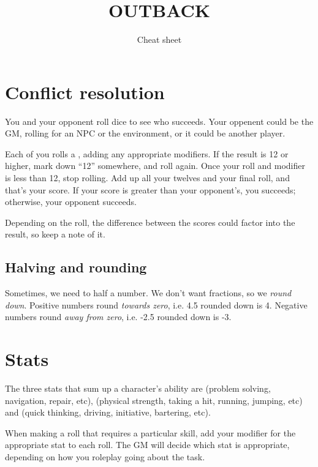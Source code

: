 \documentclass[10pt, a4paper, twocolumn]{article}
\title{\uppercase{Outback}}
\subtitle{Cheat sheet}
\date{}
\begin{document}
\maketitle

\section{Conflict resolution}
You and your opponent roll dice to see who succeeds. Your oppenent could be the
GM, rolling for an NPC or the environment, or it could be another player.

Each of you rolls a , adding any appropriate modifiers. If the result
is 12 or higher, mark down ``12'' somewhere, and roll again. Once your roll and
modifier is less than 12, stop rolling. Add up all your twelves and your final
roll, and that's your score. If your score is greater than your opponent's, you
succeeds; otherwise, your opponent succeeds.

Depending on the roll, the difference between the scores could factor into the
result, so keep a note of it. 

\subsection{Halving and rounding}
Sometimes, we need to half a number. We don't want fractions, so we
\emph{round down}. Positive numbers round \emph{towards zero}, i.e. 4.5
rounded down is 4. Negative numbers round \emph{away from zero}, i.e. -2.5
rounded down is -3.

\section{Stats}
The three stats that sum up a character's ability are  (problem
solving, navigation, repair,  etc),  (physical strength, taking a
hit, running, jumping, etc) and  (quick thinking, driving,
initiative, bartering, etc).

When making a roll that requires a particular skill, add your modifier for the
appropriate stat to each roll. The GM will decide which stat is appropriate,
depending on how you roleplay going about the task.
\end{document}
